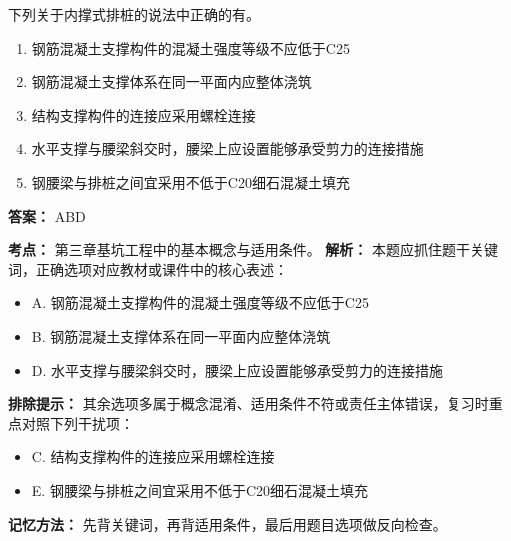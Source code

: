 \documentclass[UTF8,fontset=fandol,11pt]{ctexart}
\begin{document}
\begin{quizbox}[title={第 3 题}]
下列关于内撑式排桩的说法中正确的有。\\
\begin{enumerate}[label=\Alph*.]
\item 钢筋混凝土支撑构件的混凝土强度等级不应低于C25
\item 钢筋混凝土支撑体系在同一平面内应整体浇筑
\item 结构支撑构件的连接应采用螺栓连接
\item 水平支撑与腰梁斜交时，腰梁上应设置能够承受剪力的连接措施
\item 钢腰梁与排桩之间宜采用不低于C20细石混凝土填充
\end{enumerate}
\textbf{答案：} ABD
\vspace{0.25em}
\begin{answerbox}[title={考点解析}]
\textbf{考点：} 第三章基坑工程中的基本概念与适用条件。
\textbf{解析：} 本题应抓住题干关键词，正确选项对应教材或课件中的核心表述：
\begin{itemize}
\item A. 钢筋混凝土支撑构件的混凝土强度等级不应低于C25
\item B. 钢筋混凝土支撑体系在同一平面内应整体浇筑
\item D. 水平支撑与腰梁斜交时，腰梁上应设置能够承受剪力的连接措施
\end{itemize}
\textbf{排除提示：} 其余选项多属于概念混淆、适用条件不符或责任主体错误，复习时重点对照下列干扰项：
\begin{itemize}
\item C. 结构支撑构件的连接应采用螺栓连接
\item E. 钢腰梁与排桩之间宜采用不低于C20细石混凝土填充
\end{itemize}
\textbf{记忆方法：} 先背关键词，再背适用条件，最后用题目选项做反向检查。
\end{answerbox}
\end{quizbox}

\vspace{0.2em}
\end{document}
